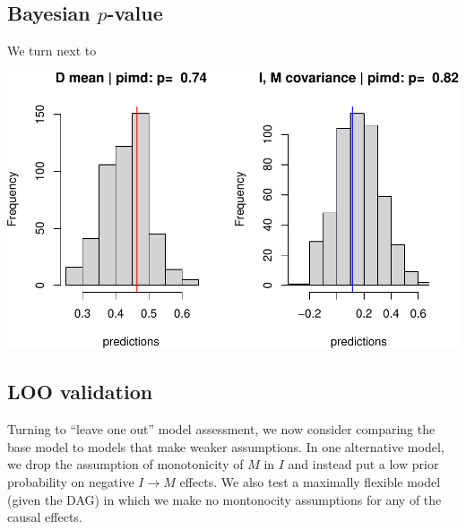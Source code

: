 \documentclass[
  12pt,
]{book}
\begin{document}
\hypertarget{bayesian-p-value}{%
\subsection{\texorpdfstring{Bayesian \(p\)-value}{Bayesian p-value}}\label{bayesian-p-value}}

We turn next to

\includegraphics{ii_files/figure-latex/ch15pvalue_pimd-1.pdf}

\hypertarget{loo-validation}{%
\subsection{LOO validation}\label{loo-validation}}

Turning to ``leave one out'' model assessment, we now consider comparing the base model to models that make weaker assumptions. In one alternative model, we drop the assumption of monotonicity of \(M\) in \(I\) and instead put a low prior probability on negative \(I \rightarrow M\) effects. We also test a maximally flexible model (given the DAG) in which we make no montonocity assumptions for any of the causal effects.
\end{document}
